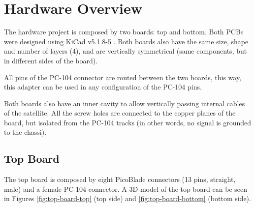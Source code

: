 %
%
%
%
%

%
%
%
%
%
%

\chapter{Hardware Overview} \label{ch:hardware}

The hardware project is composed by two boards: top and bottom. Both PCBs were designed using KiCad v5.1.8-5 \cite{kicad}. Both boards also have the same size, shape and number of layers (4), and are vertically symmetrical (same components, but in different sides of the board).

All pins of the PC-104 connector are routed between the two boards, this way, this adapter can be used in any configuration of the PC-104 pins.

Both boards also have an inner cavity to allow vertically passing internal cables of the satellite. All the screw holes are connected to the copper planes of the board, but isolated from the PC-104 tracks (in other words, no signal is grounded to the chassi).

\section{Top Board}

The top board is composed by eight PicoBlade connectors (13 pins, straight, male) and a female PC-104 connector. A 3D model of the top board can be seen in Figures \ref{fig:top-board-top} (top side) and \ref{fig:top-board-bottom} (bottom side).

